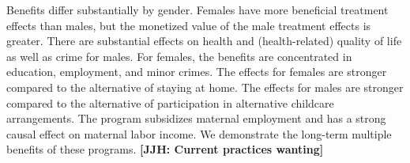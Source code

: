 Benefits differ substantially by gender. Females have more beneficial treatment effects than males, but the monetized value of the male treatment effects is greater. There are substantial effects on health and (health-related) quality of life as well as crime for males. For females, the benefits are concentrated in education, employment, and minor crimes. The effects for females are stronger compared to the alternative of staying at home. The effects for males are stronger compared to the alternative of participation in alternative childcare arrangements. The program subsidizes maternal employment and has a strong causal effect on maternal labor income. We demonstrate the long-term multiple benefits of these programs. \textbf{[JJH: Current practices wanting]}

\clearpage

\singlespace



 